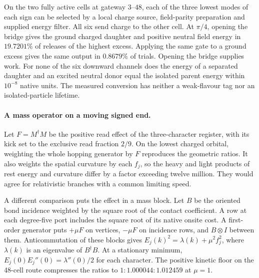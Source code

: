 On the two fully active cells at gateway $3$--$48$, each of the three
lowest modes of each sign can be selected by a local charge source,
field-parity preparation and supplied energy filter. All six send charge
to the other cell. At $\pi/4$, opening the bridge gives the ground charged
daughter and positive neutral field energy in $19.7201\%$ of releases of
the highest excess. Applying the same gate to a ground excess gives
the same output in $0.8679\%$ of trials. Opening the bridge supplies work.
For none of the six downward channels does the energy of a separated
daughter and an excited neutral donor equal the isolated parent energy
within $10^{-8}$ native units. The measured conversion has neither a
weak-flavour tag nor an isolated-particle lifetime.

\paragraph{A mass operator on a moving signed end.}
Let $F=M^\dagger M$ be the positive read effect of the three-character
register, with its kick set to the exclusive read fraction $2/9$.
On the lowest charged orbital, weighting the whole hopping generator
by $F$ reproduces the geometric ratios. It also weights the spatial
curvature by each $f_j$, so the heavy and light products of rest energy
and curvature differ by a factor exceeding twelve million. They
would agree for relativistic branches with a common limiting speed.

A different comparison puts the effect in a mass block. Let $B$ be the
oriented bond incidence weighted by the square root of the contact
coefficient. A row at each degree-five port includes the square root
of its native onsite cost. A first-order generator puts $+\mu F$ on
vertices, $-\mu F$ on incidence rows, and $B\otimes I$ between them.
Anticommutation of these blocks gives
$E_j(k)^2=\lambda(k)+\mu^2 f_j^2$, where $\lambda(k)$ is an eigenvalue
of $B^\dagger B$. At a stationary minimum,
$E_j(0)E_j''(0)=\lambda''(0)/2$ for each character.
The positive kinetic floor on the 48-cell route compresses the ratios
to $1:1.000044:1.012459$ at $\mu=1$.

